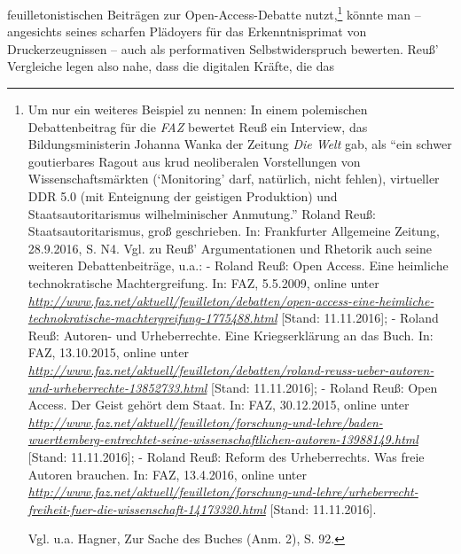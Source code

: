 \documentclass[a4paper,
fontsize=11pt,
oneside,
numbers=noperiodatend,
parskip=half-,
bibliography=totoc,
final
]{scrartcl}
\begin{document}
feuilletonistischen Beiträgen zur Open-Access-Debatte nutzt,\footnote{Um
  nur ein weiteres Beispiel zu nennen: In einem polemischen
  Debattenbeitrag für die \emph{FAZ} bewertet Reuß ein Interview, das
  Bildungsministerin Johanna Wanka der Zeitung \emph{Die Welt} gab, als
  \enquote{ein schwer goutierbares Ragout aus krud neoliberalen
  Vorstellungen von Wissenschaftsmärkten (\enquote{Monitoring} darf,
  natürlich, nicht fehlen), virtueller DDR 5.0 (mit Enteignung der
  geistigen Produktion) und Staatsautoritarismus wilhelminischer
  Anmutung.} Roland Reuß: Staatsautoritarismus, groß geschrieben. In:
  Frankfurter Allgemeine Zeitung, 28.9.2016, S. N4. Vgl. zu Reuß'
  Argumentationen und Rhetorik auch seine weiteren Debattenbeiträge,
  u.a.: - Roland Reuß: Open Access. Eine heimliche technokratische
  Machtergreifung. In: FAZ, 5.5.2009, online unter
  \href{http://www.faz.net/aktuell/feuilleton/debatten/open-access-eine-heimliche-technokratische-machtergreifung-1775488.html}{\emph{http://www.faz.net/aktuell/feuilleton/debatten/open-access-eine-heimliche-technokratische-machtergreifung-1775488.html}}
  {[}Stand: 11.11.2016{]}; - Roland Reuß: Autoren- und Urheberrechte.
  Eine Kriegserklärung an das Buch. In: FAZ, 13.10.2015, online unter
  \href{http://www.faz.net/aktuell/feuilleton/debatten/roland-reuss-ueber-autoren-und-urheberrechte-13852733.html}{\emph{http://www.faz.net/aktuell/feuilleton/debatten/roland-reuss-ueber-autoren-und-urheberrechte-13852733.html}}
  {[}Stand: 11.11.2016{]}; - Roland Reuß: Open Access. Der Geist gehört
  dem Staat. In: FAZ, 30.12.2015, online unter
  \href{http://www.faz.net/aktuell/feuilleton/forschung-und-lehre/baden-wuerttemberg-entrechtet-seine-wissenschaftlichen-autoren-13988149.html}{\emph{http://www.faz.net/aktuell/feuilleton/forschung-und-lehre/baden-wuerttemberg-entrechtet-seine-wissenschaftlichen-autoren-13988149.html}}
  {[}Stand: 11.11.2016{]}; - Roland Reuß: Reform des Urheberrechts. Was
  freie Autoren brauchen. In: FAZ, 13.4.2016, online unter
  \href{http://www.faz.net/aktuell/feuilleton/forschung-und-lehre/urheberrecht-freiheit-fuer-die-wissenschaft-14173320.html}{\emph{http://www.faz.net/aktuell/feuilleton/forschung-und-lehre/urheberrecht-freiheit-fuer-die-wissenschaft-14173320.html}}
  {[}Stand: 11.11.2016{]}.

  Vgl. u.a. Hagner, Zur Sache des Buches (Anm. 2), S. 92.} könnte man --
angesichts seines scharfen Plädoyers für das Erkenntnisprimat von
Druckerzeugnissen -- auch als performativen Selbstwiderspruch bewerten.
Reuß' Vergleiche legen also nahe, dass die digitalen Kräfte, die das
\end{document}
